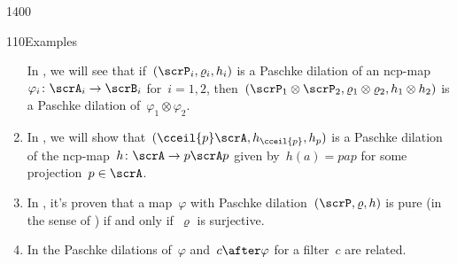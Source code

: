 \begin{parsec}{1400}
\begin{point}{110}{Examples}
\begin{enumerate}
In , we will see
    that if~$(\scrP_i, \varrho_i, h_i)$
    is a Paschke dilation of an ncp-map~$\varphi_i \colon \scrA_i \to \scrB_i$
    for~$i=1,2$,
    then~$(\scrP_1 \otimes \scrP_2, \varrho_1\otimes \varrho_2, h_1\otimes h_2)$
    is a Paschke dilation of~$\varphi_1 \otimes \varphi_2$.
\item
In , we will
    show that~$(\cceil{p}\scrA, h_{\cceil{p}}, h_p)$
    is a Paschke dilation of the
    ncp-map~$h\colon \scrA \to p \scrA p$
    given by~$h(a) = pap$ for some projection~$p\in \scrA$.
\item
In , it's proven
    that a map~$\varphi$
    with Paschke dilation~$(\scrP, \varrho, h)$
    is pure (in the sense of )
    if and only if~$\varrho$ is surjective.
\item
In 
    the Paschke dilations of~$\varphi$
    and~$c \after \varphi$ for a filter~$c$ are related.
\end{enumerate}
\spacingfix{}
\end{point}
\end{parsec}


